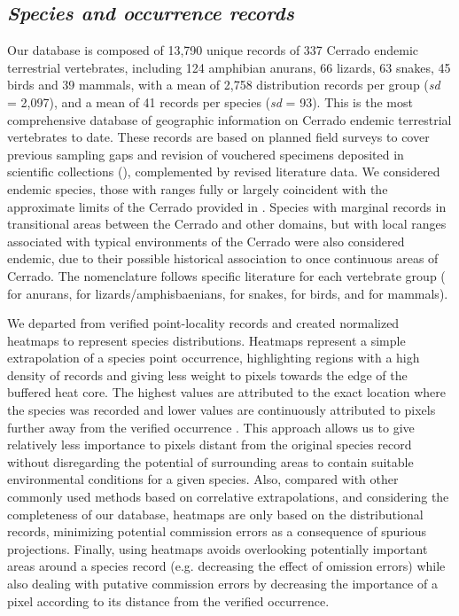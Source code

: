 \documentclass[12pt,openright,oneside,a4paper,english]{abntex2}
\begin{document}
\subsection{\textit{Species and occurrence records}}

Our database is composed of 13,790 unique records of 337 Cerrado endemic terrestrial vertebrates, including 124 amphibian anurans, 66 lizards, 63 snakes, 45 birds and 39 mammals, with a mean of 2,758 distribution records per group (\textit{sd} = 2,097), and a mean of 41 records per species (\textit{sd} = 93). This is the most comprehensive database of geographic information on Cerrado endemic terrestrial vertebrates to date. These records are based on planned field surveys to cover previous sampling gaps and revision of vouchered specimens deposited in scientific collections (\citealp[see details in][]{Nogueira2009, Valdujo2012, Nogueira2019, Carmignotto2022}), complemented by revised literature data. We considered endemic species, those with ranges fully or largely coincident with the approximate limits of the Cerrado provided in \citet{Dinerstein2017}. Species with marginal records in transitional areas between the Cerrado and other domains, but with local ranges associated with typical environments of the Cerrado were also considered endemic, due to their possible historical association to once continuous areas of Cerrado. The nomenclature follows specific literature for each vertebrate group (\citealp{Frost2020} for anurans, \citealp{Uetz2020} for lizards/amphisbaenians, \citealp{Nogueira2019} for snakes, \citealp{Pacheco2021birds} for birds, and \citealp{Abreu2021} for mammals).

We departed from verified point-locality records and created normalized heatmaps to represent species distributions. Heatmaps represent a simple extrapolation of a species point occurrence, highlighting regions with a high density of records and giving less weight to pixels towards the edge of the buffered heat core. The highest values are attributed to the exact location where the species was recorded and lower values are continuously attributed to pixels further away from the verified occurrence \citep{QGISUserGuide}. This approach allows us to give relatively less importance to pixels distant from the original species record without disregarding the potential of surrounding areas to contain suitable environmental conditions for a given species. Also, compared with other commonly used methods based on correlative extrapolations, and considering the completeness of our database, heatmaps are only based on the distributional records, minimizing potential commission errors as a consequence of spurious projections. Finally, using heatmaps avoids overlooking potentially important areas around a species record (e.g. decreasing the effect of omission errors) while also dealing with putative commission errors by decreasing the importance of a pixel according to its distance from the verified occurrence. 
\end{document}
